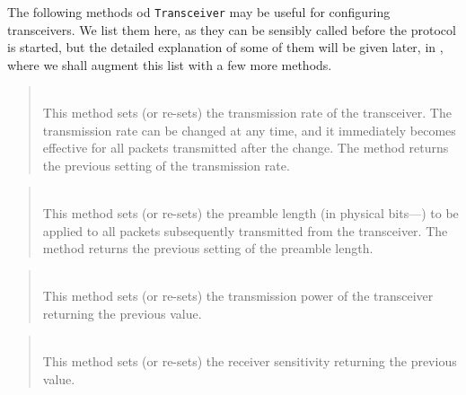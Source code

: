 The following methods od {\tt Transceiver} may be useful for configuring
transceivers.
We list them here,
as they can be sensibly called before the protocol is started,
but the detailed explanation of some of them will be given later, in
, where we shall augment this list with a few more methods.

\begin{quote}
\noindent{} \hspace{0in}\vspace{0.05in}\\
\noindent
This method sets (or re-sets) the transmission rate of the transceiver.
The transmission rate can be changed at any time, and it immediately
becomes effective for all packets transmitted after the change.
The method returns the previous setting of the transmission rate.
\end{quote}

\begin{quote}
\noindent{} \hspace{0in}\vspace{0.05in}\\
\noindent
This method sets (or re-sets) the preamble length
(in physical bits---)
to be applied to all
packets subsequently transmitted from the transceiver.
The method returns the previous setting of the preamble length.
\end{quote}

\begin{quote}
\noindent{} \hspace{0in}\vspace{0.05in}\\
\noindent
This method sets (or re-sets) the transmission power of the transceiver
returning the previous value.
\end{quote}

\begin{quote}
\noindent{} \hspace{0in}\vspace{0.05in}\\
\noindent
This method sets (or re-sets) the receiver sensitivity
returning the previous value.
\end{quote}

